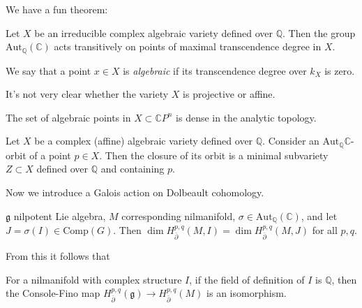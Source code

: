 \noindent
We have a fun theorem:

\begin{theorem}
\label{theorem-fun-theorem}
Let $X$ be an irreducible complex algebraic
variety defined over $\mathbb{Q}$.
Then the group
$\text{Aut}_\mathbb{Q}(\mathbb{C})$ acts
transitively
on points of maximal transcendence degree in
$X$.
\end{theorem}

\begin{definition}
\label{definition-algebraic-point}
We say that a point $x \in X$ is {\it
algebraic} if
its transcendence degree over $k_X$ is zero.
\end{definition}

\noindent
It's not very clear whether the variety $X$
is projective or affine.

\begin{lemma}
\label{lemma-algebraic-points-are-dense}
The set of algebraic points in
$X\subset\mathbb{C}P^n$ is dense
in the analytic topology.
\end{lemma}

\begin{theorem}
\label{theorem-aut-orbit-of-point}
Let $X$ be a complex (affine) algebraic
variety defined over $\mathbb{Q}$.
Consider an
$\text{Aut}_{\mathbb{Q}}\mathbb{C}$-orbit of
a point
$p \in X$. Then the closure of its orbit is a
minimal subvariety $Z \subset X$ defined
over $\mathbb{Q}$ and containing $p$.
\end{theorem}

\noindent
Now we introduce a Galois action on Dolbeault
cohomology.

\begin{theorem}
\label{theorem-duplicate-2}
$\mathfrak{g}$ nilpotent Lie algebra, $M$
corresponding nilmanifold,
$\sigma \in
\text{Aut}_{\mathbb{Q}}(\mathbb{C})$,
and let $J=\sigma(I) \in \text{Comp}(G)$.
Then $\dim H^{p,q}_{\overline{\partial}}(M,I)
=\dim H^{p,q}_{\overline{\partial}}(M,J)$ for
all $p,q$.
\end{theorem}

From this it follows that

\begin{lemma}
\label{lemma-console-fino-complex-structure}
For a nilmanifold with complex structure $I$,
if the field of definition of $I$ is
$\mathbb{Q}$,
then the Console-Fino map
$H_{\overline{\partial}}^{p,q}(\mathfrak{g})
\to
H_{\overline{\partial}}^{p,q}(M)$ is an
isomorphism.
\end{lemma}

